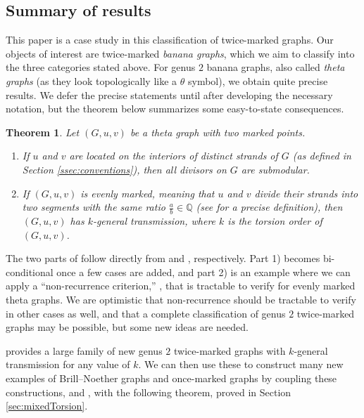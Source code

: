 \documentclass[11pt]{article}
\newtheorem{theorem}[theo]{Theorem}
\theoremstyle{definition}
\numberwithin{equation}{section}
\newcommand{\Q}{\mathbb{Q}}
\begin{document}
\subsection{Summary of results}

This paper is a case study in this classification of twice-marked graphs. Our objects of interest are twice-marked \emph{banana graphs}, which we aim to classify into the three categories stated above.
For genus $2$ banana graphs, also called \emph{theta graphs} (as they look topologically like a $\theta$ symbol), we obtain quite precise results. We defer the precise statements until after developing the necessary notation, but the theorem below summarizes some easy-to-state consequences.

\begin{theorem}\label{thm:thetaSimple}
Let $(G,u,v)$ be a theta graph with two marked points.
\begin{enumerate}[label = \arabic*)]
    \item If $u$ and $v$ are located on the interiors of distinct strands of $G$ (as defined in Section \ref{ssec:conventions}), then all divisors on $G$ are submodular.
    \item If $(G,u,v)$ is \emph{evenly marked}, meaning that $u$ and $v$ divide their strands into two segments with the same ratio $\frac{a}{b} \in \Q$ (see  for a precise definition), then $(G,u,v)$ has $k$-general transmission, where 
    $k$ is the torsion order of $(G,u,v)$.
\end{enumerate}
\end{theorem}

The two parts of  follow directly from  and , respectively. Part 1) becomes bi-conditional once a few cases are added, and part 2) is an example where we can apply a ``non-recurrence criterion,'' , that is tractable to verify for evenly marked theta graphs. We are optimistic that non-recurrence should be tractable to verify in other cases as well, and that a complete classification of genus $2$ twice-marked graphs may be possible, but some new ideas are needed.

 provides a large family of new genus $2$ twice-marked graphs with $k$-general transmission for any value of $k$. We can then use these to construct many new examples of Brill--Noether graphs and once-marked graphs by coupling these constructions, and , with the following theorem, proved in Section \ref{sec:mixedTorsion}.
\end{document}
